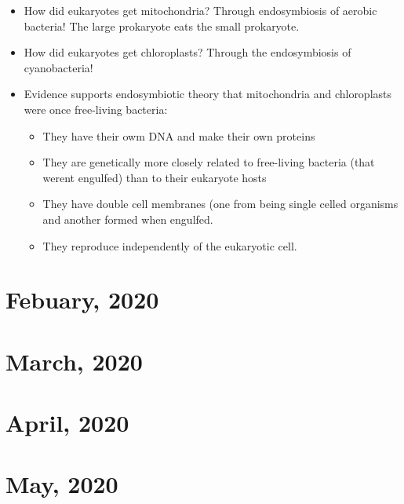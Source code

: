 \documentclass[10pt, oneside]{article}
\begin{document}
\begin{itemize}
\item How did eukaryotes get mitochondria? Through endosymbiosis of aerobic bacteria! The large prokaryote eats the small prokaryote.
\item How did eukaryotes get chloroplasts? Through the endosymbiosis of cyanobacteria!
\item Evidence supports endosymbiotic theory that mitochondria and chloroplasts were once free-living bacteria:
\begin{itemize}
\item They have their owm DNA and make their own proteins
\item They are genetically more closely related to free-living bacteria (that werent engulfed) than to their eukaryote hosts
\item They have double cell membranes (one from being single celled organisms and another formed when engulfed.
\item They reproduce independently of the eukaryotic cell.
\end{itemize}
\end{itemize}


\section{Febuary, 2020}

\section{March, 2020}

\section{April, 2020}

\section{May, 2020}
\end{document}

